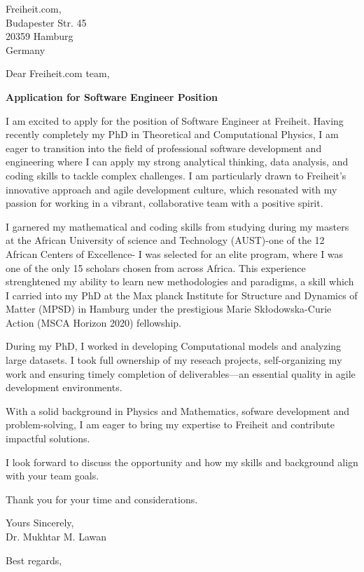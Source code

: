 \documentclass[a4paper,12pt]{letter}  %
\begin{document}
\signature{Mukhtar M. Lawan}  %
\address{Mukhtar M. Lawan \\ Rehrstieg 16D \\ 21147, Hamburg \\ 
}

\begin{letter}{Freiheit.com, \\ Budapester Str. 45 \\ 20359 Hamburg \\ Germany}


\opening{Dear Freiheit.com team,}

\begin{center}
    \textbf{Application for Software Engineer Position}
\end{center}

I am excited to apply for the position of Software Engineer at Freiheit. Having
recently completely my PhD in Theoretical and Computational Physics, I am eager to 
transition into the field of professional software development and engineering where
I can apply my strong analytical thinking, data analysis, and coding skills to tackle 
complex challenges. I am particularly drawn to Freiheit's innovative approach and agile
development culture, which resonated with my passion for working in a vibrant, collaborative
team with a positive spirit.


I garnered my mathematical and coding skills from studying during my masters 
at the African University of science and Technology (AUST)-one of the 12 African Centers
of Excellence- I was selected for an elite program, where I was one of the only 15 
scholars chosen from across Africa. This experience strenghtened my ability to learn
new methodologies and paradigms, a skill which I carried into my PhD at the Max planck
Institute for Structure and Dynamics of Matter (MPSD) in Hamburg under the  prestigious 
Marie Skłodowska-Curie Action (MSCA Horizon 2020) fellowship. 

During my PhD, I worked in developing Computational models and analyzing large datasets.
I took full ownership of my reseach projects, self-organizing my work and ensuring timely completion 
of deliverables—an essential quality in agile development environments.

With a solid background in Physics and  Mathematics, sofware development and problem-solving, I am 
eager to bring my expertise to Freiheit and contribute impactful solutions. 

I look forward to discuss the opportunity and how my skills and background align with
your team goals. 

Thank you for your time and considerations.

Yours Sincerely, \\
\vspace{5mm}
Dr. Mukhtar M. Lawan

\closing{\hspace*{0pt}Best regards, }

\end{letter}
\end{document}

